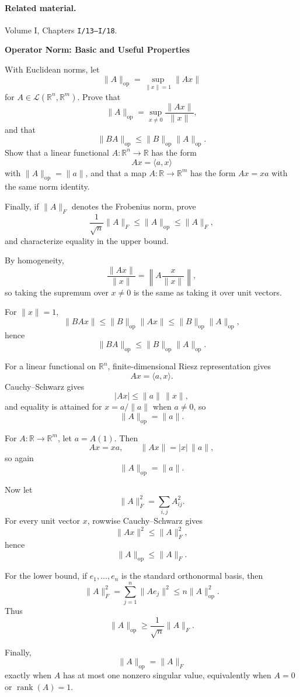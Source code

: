 \paragraph{Related material.} Volume I, Chapters \texttt{I/13--I/18}.

\begin{problem}[CP-I-0001]
\label{prob:cp-i-0001}
\textbf{Operator Norm: Basic and Useful Properties}

\hspace*{1.5em}With Euclidean norms, let
\[
\|A\|_{\mathrm{op}}
=
\sup_{\|x\|=1}\|Ax\|
\]
for \(A\in\mathcal L(\mathbb R^n,\mathbb R^m)\). Prove that
\[
\|A\|_{\mathrm{op}}
=
\sup_{x\ne0}\frac{\|Ax\|}{\|x\|},
\]
and that
\[
\|BA\|_{\mathrm{op}}
\le
\|B\|_{\mathrm{op}}\|A\|_{\mathrm{op}}.
\]
Show that a linear functional \(A:\mathbb R^n\to\mathbb R\) has the form
\[
Ax=\langle a,x\rangle
\]
with \(\|A\|_{\mathrm{op}}=\|a\|\), and that a map \(A:\mathbb R\to\mathbb R^m\) has the form
\(Ax=xa\) with the same norm identity.

Finally, if \(\|A\|_F\) denotes the Frobenius norm, prove
\[
\frac1{\sqrt n}\|A\|_F
\le
\|A\|_{\mathrm{op}}
\le
\|A\|_F,
\]
and characterize equality in the upper bound.
\end{problem}

\begin{solution}
By homogeneity,
\[
\frac{\|Ax\|}{\|x\|}
=
\left\|A\frac{x}{\|x\|}\right\|,
\]
so taking the supremum over \(x\ne0\) is the same as taking it over unit vectors.

For \(\|x\|=1\),
\[
\|BAx\|
\le
\|B\|_{\mathrm{op}}\|Ax\|
\le
\|B\|_{\mathrm{op}}\|A\|_{\mathrm{op}},
\]
hence
\[
\|BA\|_{\mathrm{op}}
\le
\|B\|_{\mathrm{op}}\|A\|_{\mathrm{op}}.
\]

For a linear functional on \(\mathbb R^n\), finite-dimensional Riesz representation gives
\[
Ax=\langle a,x\rangle.
\]
Cauchy--Schwarz gives
\[
|Ax|
\le
\|a\|\,\|x\|,
\]
and equality is attained for \(x=a/\|a\|\) when \(a\ne0\), so
\[
\|A\|_{\mathrm{op}}=\|a\|.
\]

For \(A:\mathbb R\to\mathbb R^m\), let \(a=A(1)\). Then
\[
Ax=xa,
\qquad
\|Ax\|=|x|\,\|a\|,
\]
so again
\[
\|A\|_{\mathrm{op}}=\|a\|.
\]

Now let
\[
\|A\|_F^2=\sum_{i,j}A_{ij}^2.
\]
For every unit vector \(x\), rowwise Cauchy--Schwarz gives
\[
\|Ax\|^2
\le
\|A\|_F^2,
\]
hence
\[
\|A\|_{\mathrm{op}}\le\|A\|_F.
\]

For the lower bound, if \(e_1,\dots,e_n\) is the standard orthonormal basis, then
\[
\|A\|_F^2
=
\sum_{j=1}^n\|Ae_j\|^2
\le
n\|A\|_{\mathrm{op}}^2.
\]
Thus
\[
\|A\|_{\mathrm{op}}
\ge
\frac1{\sqrt n}\|A\|_F.
\]

Finally,
\[
\|A\|_{\mathrm{op}}=\|A\|_F
\]
exactly when \(A\) has at most one nonzero singular value, equivalently when \(A=0\) or
\(\operatorname{rank}(A)=1\).
\end{solution}

